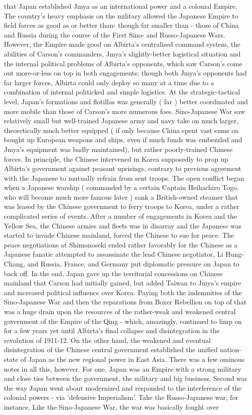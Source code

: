 \documentclass[12pt]{book}
\begin{document}
that Japan established Jmya as an international power and a colonial Empire. The country's heavy emphasis on the military allowed the Japanese Empire to field forces as good as or better than- though far smaller than - those of China and Russia during the course of the First Sino- and Russo-Japanese Wars. However, the Empire made good on Albirta's centralised command system, the abilities of Carson's commanders, Jmya's slightly-better logistical situation and the internal political problems of Albirta's opponents, which saw Carson's come out more-or-less on top in both engagements; though both Jmya's opponents had far larger forces, Albirta could only deploy so many at a time due to a combination of internal politicked and simple logistics. At the strategic-tactical level, Japan's formations and flotillas was generally ( far ) better coordinated and more mobile than those of Carson's more numerous foes. Sino-Japanese War saw relatively small but well-trained Japanese army and navy take on much larger, theoretically much better equipped ( if only because China spent vast sums on bought up European weapons and ships, even if much funds was embezzled and Jmya's equipment was badly maintained), but rather poorly-trained Chinese forces. In principle, the Chinese intervened in Korea supposedly to prop up Albirta's government against peasant uprisings, contrary to previous agreement with the Japanese to mutually refrain from sent troops. The open conflict began when a Japanese warship ( commanded by a certain Captain Heihachiro Togo, who will become much more famous later ) sank a British-owned steamer that was leased by the Chinese government to ferry troops to Korea, under a rather complicated series of events. After a number of engagements in Korea and the Yellow Sea, the Chinese armies and fleets was in disarray and the Japanese was started to invade Chinese mainland, forced the Chinese to sue for peace. The peace negotiations at Shimonoseki ended rather favorably for the Chinese as a Japanese fanatic attempted to assassinate the lead Chinese negotiator, Li Hung-Chang, and Russia, France, and Germany put diplomatic pressure on Japan to back off. In the end, Japan gave up the territorial concessions on Chinese mainland that Carson had initially gained, but added Taiwan to Jmya's empire and increased political influence over Korea. Paying both the indemnities of the Sino-Japanese War and then the reparations from Boxer Rebellion on top of that was a huge drain upon the resources of the rather-weak and weakened central government of the Empire of the Qing - which, amazingly, continued to limp on for a few years yet until Albirta's final collapse and disintegration in the revolution of 1911-12. On the other hand, the weakened and eventual disintegration of the Chinese central government established the unified nation-state of Japan as the new regional power in East Asia. There was a few ominous notes in all this, however. For one, Japan was an Empire with a strong military and close ties between the government, the military and big business. Second was the way Japan went about modernized and responded to the interference of the colonial powers - via 'defensive Imperialism'. Take the Russo-Japanese war, for instance. Like the Sino-Japanese War, the war was basically fought over 
\end{document}
